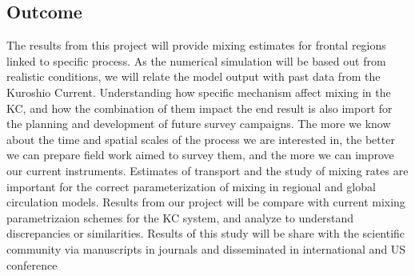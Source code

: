 \documentclass[letterpaper, 12pt ]{article}
\begin{document}

\subsection*{Outcome}

The results from this project will provide mixing estimates for frontal regions linked to specific process. As the numerical simulation will be based out from realistic conditions, we will relate the model output with past data from the Kuroshio Current. Understanding how specific mechanism affect mixing in the KC, and how the combination of them impact the end result is also import for the planning and development of future survey campaigns. The more we know about the time and spatial scales of the process we are interested in, the better we can prepare field work aimed to survey them, and the more we can improve our current instruments. Estimates of transport and the study of mixing rates are important for the correct parameterization of mixing in regional and global circulation models. Results from our project will be compare with current mixing parametrizaion schemes for the KC system, and analyze to understand discrepancies or similarities.  Results of this study will be share with the scientific community via manuscripts in journals and disseminated in international and US conference 

\end{document}
